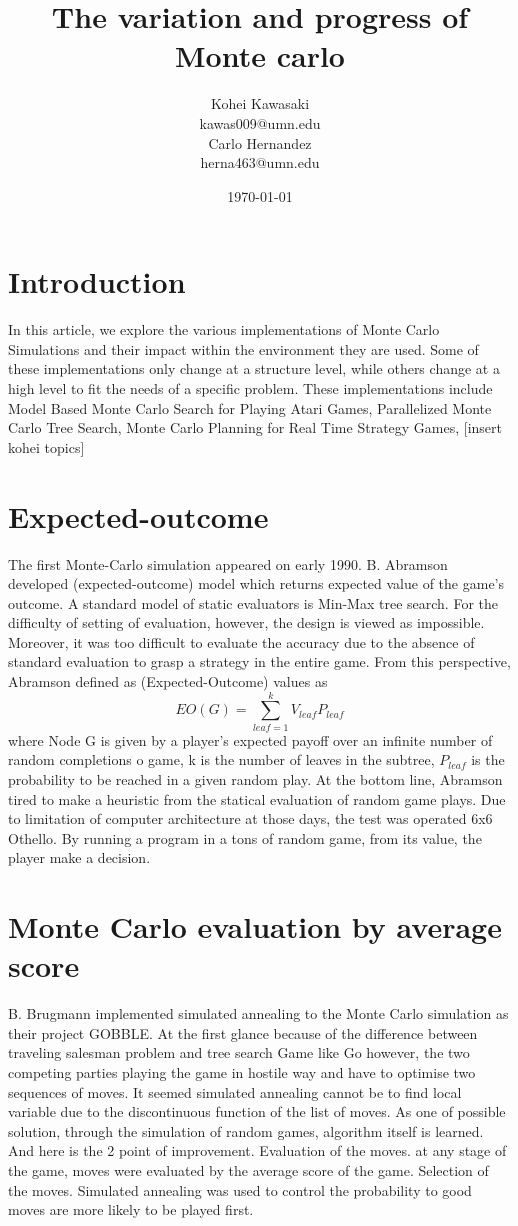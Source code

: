 \documentclass[11pt]{article}
\title{The variation and progress of Monte carlo}
\author{
Kohei Kawasaki\\kawas009@umn.edu\\
Carlo Hernandez\\herna463@umn.edu
}
\date{\today}
\begin{document}
\maketitle
\section{Introduction}
In this article, we explore the various implementations of Monte Carlo Simulations and their impact within the environment they are used. Some of these implementations only change at a structure level, while others change at a high level to fit the needs of a specific problem. These implementations include Model Based Monte Carlo Search for Playing Atari Games, Parallelized Monte Carlo Tree Search, Monte Carlo Planning for Real Time Strategy Games, [insert kohei topics]

\section{Expected-outcome}
The first Monte-Carlo simulation appeared on early 1990. B. Abramson developed (expected-outcome) model which returns expected value of the game’s outcome\cite{abramson1990expected}. A standard model of static evaluators is Min-Max tree search. For the difficulty of setting of evaluation, however, the design is viewed as impossible. Moreover, it was too difficult to evaluate the accuracy due to the absence of standard evaluation to grasp a strategy in the entire game. From this perspective, Abramson defined as (Expected-Outcome) values as 
\[EO(G) = \sum_{leaf=1}^{k} V_{leaf} P_{leaf}\]
where Node G is given by a player’s expected payoff over an infinite number of random completions o game, k is the number of leaves in the subtree, \(P_{leaf}\) is the probability to be reached in a given random play. At the bottom line, Abramson tired to make a heuristic from the statical evaluation of random game plays. Due to limitation of computer architecture at those days, the test was operated 6x6 Othello. By running a program in a tons of random game, from its value, the player make a decision. 
\section{Monte Carlo evaluation by average score}
B. Brugmann implemented simulated annealing to the Monte Carlo simulation as their project GOBBLE\cite{brugmann1993monte}. At the first glance because of the difference between traveling salesman problem and tree search Game like Go however, the two competing parties playing the game in hostile way and have to optimise two sequences of moves. It seemed simulated annealing cannot be to find local variable due to the discontinuous function of the list of moves. As one of possible solution, through the simulation of random games, algorithm itself is learned. And here is the 2 point of improvement. Evaluation of the moves. at any stage of the game, moves were evaluated by the average score of the game. Selection of the moves. Simulated annealing was used to control the probability to good moves are more likely to be played first.
\end{document}
